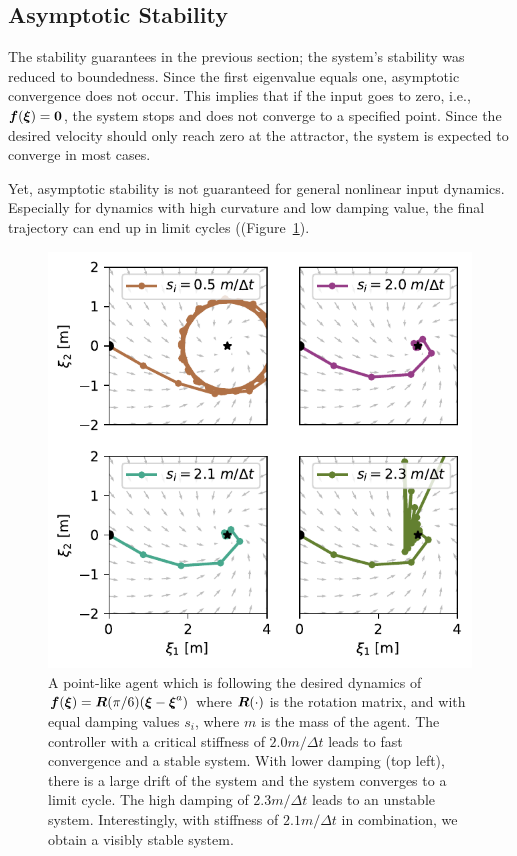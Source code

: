 \subsection{Asymptotic Stability}
The stability guarantees in the previous section; the system's stability was reduced to boundedness. 
Since the first eigenvalue equals one, asymptotic convergence does not occur. 
This implies that if the input goes to zero, i.e., $\boldsymbol{f}(\boldsymbol{\xi}) = \boldsymbol{0}$, the system stops and does not converge to a specified point. Since the desired velocity should only reach zero at the attractor, the system is expected to converge in most cases.

Yet, asymptotic stability is not guaranteed for general nonlinear input dynamics. Especially for dynamics with high curvature and low damping value, the final trajectory can end up in limit cycles ((Figure~\ref{fig:discrete_controller_parameters_comparison_stable}).

\begin{figure}[htb]
\centering
  \includegraphics[width=\columnwidth]{figures/discrete_controller_parameters_comparison_stable}
\caption{A point-like agent which is following the desired dynamics of
$\boldsymbol{f}(\boldsymbol{\xi}) = \boldsymbol{R}(\pi / 6) (\boldsymbol{\xi}  - \boldsymbol{\xi}^a)$ where $\boldsymbol{R}(\cdot)$ is the rotation matrix, and with equal damping values $s_i$, where $m$ is the mass of the agent.
The controller with a critical stiffness of $2.0 m / \Delta t$ leads to fast convergence and a stable system. With lower damping (top left), there is a large drift of the system and the system converges to a limit cycle. 
The high damping of $2.3 m / \Delta t$ leads to an unstable system. 
Interestingly, with stiffness of $2.1 m / \Delta t$ in combination, we obtain a visibly stable system.}
  \label{fig:discrete_controller_parameters_comparison_stable}
\end{figure}

